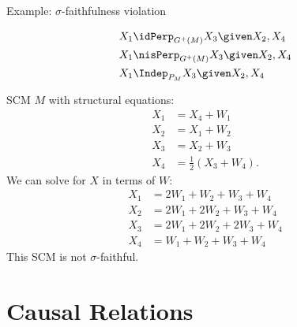 \begin{frame}{Example: $\sigma$-faithfulness violation}
  \begin{Eg}\small
  \begin{minipage}{0.4\textwidth}\centering
    \begin{align*}
      X_1 &\idPerp_{G^+(M)} X_3 \given X_2, X_4\\
      X_1 &\nisPerp_{G^+(M)} X_3 \given X_2, X_4\\
      X_1 &\Indep_{P_M} X_3 \given X_2, X_4
    \end{align*}
  \end{minipage}\quad
  \begin{minipage}{0.55\textwidth}
SCM $M$ with structural equations:
  \begin{align*}
    X_1&=X_4 + W_1 \\
    X_2&=X_1 + W_2 \\
    X_3&=X_2 + W_3 \\
    X_4&=\tfrac{1}{2} (X_3 + W_4).
  \end{align*}
We can solve for $X$ in terms of $W$:
  \begin{align*}
    X_1&=2 W_1 + W_2 + W_3 + W_4 \\
    X_2&=2 W_1 + 2 W_2 + W_3 + W_4 \\
    X_3&=2 W_1 + 2 W_2 + 2 W_3 + W_4 \\
    X_4&=W_1 + W_2 + W_3 + W_4
  \end{align*}
This SCM is not $\sigma$-faithful.
  \end{minipage}
\end{Eg}
\end{frame}

\part{Causal Relations}
\frame{\partpage}


